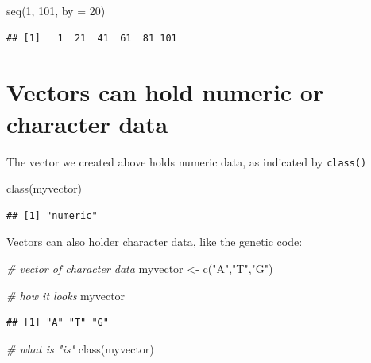 \documentclass[
]{book}
\newenvironment{Shaded}{\begin{snugshade}}{\end{snugshade}}
\newcommand{\AttributeTok}[1]{\textcolor[rgb]{0.77,0.63,0.00}{#1}}
\newcommand{\CommentTok}[1]{\textcolor[rgb]{0.56,0.35,0.01}{\textit{#1}}}
\newcommand{\DecValTok}[1]{\textcolor[rgb]{0.00,0.00,0.81}{#1}}
\newcommand{\FunctionTok}[1]{\textcolor[rgb]{0.00,0.00,0.00}{#1}}
\newcommand{\NormalTok}[1]{#1}
\newcommand{\OtherTok}[1]{\textcolor[rgb]{0.56,0.35,0.01}{#1}}
\newcommand{\StringTok}[1]{\textcolor[rgb]{0.31,0.60,0.02}{#1}}
\begin{document}
\begin{Shaded}
\begin{Highlighting}[]
\FunctionTok{seq}\NormalTok{(}\DecValTok{1}\NormalTok{, }\DecValTok{101}\NormalTok{,}
    \AttributeTok{by =} \DecValTok{20}\NormalTok{)}
\end{Highlighting}
\end{Shaded}

\begin{verbatim}
## [1]   1  21  41  61  81 101
\end{verbatim}

\hypertarget{vectors-can-hold-numeric-or-character-data}{%
\section{Vectors can hold numeric or character data}\label{vectors-can-hold-numeric-or-character-data}}

The vector we created above holds numeric data, as indicated by \texttt{class()}

\begin{Shaded}
\begin{Highlighting}[]
\FunctionTok{class}\NormalTok{(myvector)}
\end{Highlighting}
\end{Shaded}

\begin{verbatim}
## [1] "numeric"
\end{verbatim}

Vectors can also holder character data, like the genetic code:

\begin{Shaded}
\begin{Highlighting}[]
\CommentTok{\# vector of character data}
\NormalTok{myvector }\OtherTok{\textless{}{-}} \FunctionTok{c}\NormalTok{(}\StringTok{"A"}\NormalTok{,}\StringTok{"T"}\NormalTok{,}\StringTok{"G"}\NormalTok{)}

\CommentTok{\# how it looks}
\NormalTok{myvector}
\end{Highlighting}
\end{Shaded}

\begin{verbatim}
## [1] "A" "T" "G"
\end{verbatim}

\begin{Shaded}
\begin{Highlighting}[]
\CommentTok{\# what is "is"}
\FunctionTok{class}\NormalTok{(myvector)}
\end{Highlighting}
\end{Shaded}
\end{document}
